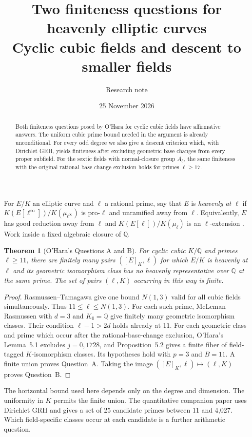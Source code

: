 \documentclass[11pt]{article}
\title{Two finiteness questions for heavenly elliptic curves\\
\large Cyclic cubic fields and descent to smaller fields}
\author{Research note}
\date{25 November 2026}
\newtheorem{theorem}{Theorem}
\begin{document}
\maketitle
\begin{abstract}
Both finiteness questions posed by O'Hara for cyclic cubic fields have affirmative answers. The uniform cubic prime bound needed in the argument is already unconditional. For every odd degree we also give a descent criterion which, with Dirichlet GRH, yields finiteness after excluding geometric base changes from every proper subfield. For the sextic fields with normal-closure group $A_5$, the same finiteness with the original rational-base-change exclusion holds for primes $\ell\ge17$.
\end{abstract}

For $E/K$ an elliptic curve and $\ell$ a rational prime, say that $E$ is
\emph{heavenly at $\ell$} if $K(E[\ell^\infty])/K(\mu_{\ell^\infty})$
is pro-$\ell$ and unramified away from $\ell$. Equivalently, $E$ has good
reduction away from $\ell$ and $K(E[\ell])/K(\mu_\ell)$ is an
$\ell$-extension \cite[Lemma 2.2]{ohara}. Work inside a fixed algebraic
closure of $\mathbb Q$.

\begin{theorem}[O'Hara's Questions A and B]
For cyclic cubic $K/\mathbb Q$ and primes $\ell\ge11$, there are finitely
many pairs $([E]_K,\ell)$ for which $E/K$ is heavenly at $\ell$ and its
geometric isomorphism class has no heavenly representative over $\mathbb Q$
at the same prime. The set of pairs $(\ell,K)$ occurring in this way is finite.
\end{theorem}
\begin{proof}
Rasmussen--Tamagawa \cite[Conjecture 2 and Proposition 7.5]{rt} give one
bound $N(1,3)$ valid for all cubic fields simultaneously. Thus $11\le\ell\le
N(1,3)$. For each such prime, McLeman--Rasmussen
\cite[Theorem 1.2, equivalently Theorem 3.1]{mr} with $d=3$ and
$K_0=\mathbb Q$ give finitely many geometric isomorphism classes. Their
condition $\ell-1>2d$ holds already at $11$. For each geometric class
and prime which occur after the rational-base-change exclusion,
O'Hara's Lemma~5.1 excludes $j=0,1728$, and Proposition~5.2 gives a finite
fiber of field-tagged $K$-isomorphism classes. Its hypotheses hold with
$p=3$ and $B=11$. A finite union proves Question~A. Taking the image
$([E]_K,\ell)\mapsto(\ell,K)$ proves Question~B.
\end{proof}
The horizontal bound used here depends only on the degree and dimension.
The uniformity in $K$ permits the finite union. The quantitative companion
paper uses Dirichlet GRH and gives a set of 25 candidate primes between
11 and 4,027. Which field-specific classes occur at each candidate is a
further arithmetic question.
\end{document}
